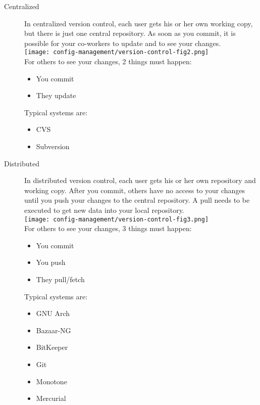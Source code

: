 \begin{description}
\item[Centralized]
In centralized version control, each user gets his or her own working
copy, but there is just one central repository. As soon as you
commit, it is possible for your co-workers to update and to see
your changes.\\
\texttt{[image: config-management/version-control-fig2.png]}\\
For others to see your changes, 2 things must happen:
\begin{itemize}
\item You commit
\item They update
\end{itemize}

Typical systems are:
  \begin{itemize}
  \item CVS
  \item Subversion
  \end{itemize}

\item[Distributed]
In distributed version control, each user gets his or her own
repository and working copy. After you commit, others have no access
to your changes until you push your changes to the central repository.
A pull needs to be executed to get new data into your local repository.\\
\texttt{[image: config-management/version-control-fig3.png]}\\
For others to see your changes, 3 things must happen:
\begin{itemize}
\item You commit
\item You push
\item They pull/fetch
\end{itemize}
Typical systems are:
  \begin{itemize}
  \item GNU Arch
  \item Bazaar-NG
  \item BitKeeper
  \item Git
  \item Monotone
  \item Mercurial
  \end{itemize}
\end{description}
\ifslides
\newpage
\fi

